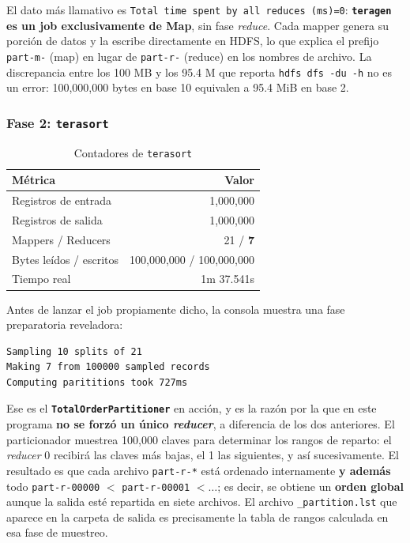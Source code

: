 El dato más llamativo es \texttt{Total time spent by all reduces (ms)=\bk{}0}: \textbf{\texttt{teragen} es un job exclusivamente de Map}, sin fase \textit{reduce}. Cada mapper genera su porción de datos y la escribe directamente en HDFS, lo que explica el prefijo \texttt{part-m-} (map) en lugar de \texttt{part-r-} (reduce) en los nombres de archivo. La discrepancia entre los \guillemotleft{}100 MB\guillemotright{} y los 95.4 M que reporta \texttt{hdfs dfs -du -h} no es un error: 100,000,000 bytes en base 10 equivalen a 95.4 MiB en base 2.


\subsubsection{Fase 2: \texttt{terasort}}

\begin{table}[H]
\centering
\caption{Contadores de \texttt{terasort}}
\label{tab:terasort}
\vspace{0.2cm}
\small
\begin{tabular}{@{}lr@{}}
\toprule
\textbf{Métrica} & \textbf{Valor} \\
\midrule
Registros de entrada     & 1,000,000 \\
Registros de salida      & 1,000,000 \\
Mappers / Reducers       & 21 / \textbf{7} \\
Bytes leídos / escritos  & 100,000,000 / 100,000,000 \\
Tiempo real              & 1m 37.541s \\
\bottomrule
\end{tabular}
\end{table}

Antes de lanzar el job propiamente dicho, la consola muestra una fase preparatoria reveladora:

\begin{lstlisting}[style=sh]
Sampling 10 splits of 21
Making 7 from 100000 sampled records
Computing parititions took 727ms
\end{lstlisting}

Ese es el \textbf{\texttt{TotalOrderPartitioner}} en acción, y es la razón por la que en este programa \textbf{no se forzó un único \textit{reducer}}, a diferencia de los dos anteriores. El particionador muestrea 100,000 claves para determinar los rangos de reparto: el \textit{reducer} 0 recibirá las claves más bajas, el 1 las siguientes, y así sucesivamente. El resultado es que cada archivo \texttt{part-r-*} está ordenado internamente \textbf{y además} todo \texttt{part-r-00000} $<$ \texttt{part-r-00001} $< \dots$; es decir, se obtiene un \textbf{orden global} aunque la salida esté repartida en siete archivos. El archivo \texttt{\_partition.lst} que aparece en la carpeta de salida es precisamente la tabla de rangos calculada en esa fase de muestreo.

